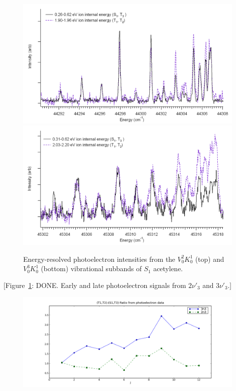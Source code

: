 \documentclass[12pt]{mitthesis}
\begin{document}
\begin{figure}[htp]
  \includegraphics[scale=0.8]{mattijs-traces-2n3.png}
  \includegraphics[scale=0.8]{mattijs-traces-3n3.png}
  \caption{Energy-resolved photoelectron intensities from the
    $V^2_0K^1_0$ (top) and $V^3_0K^1_0$ (bottom) vibrational subbands
    of $S_1$ acetylene.}
  \label{fig:mattijs-traces}
\end{figure}

[Figure~\ref{fig:mattijs-traces}: DONE. Early and late photoelectron
signals from $2\nu'_3$ and $3\nu'_3$.]

\begin{figure}[htp]
  \centering
  \includegraphics[width=7in]{mattijs-ratios.png}
  \caption{}
  \label{fig:mattijs-ratios}
\end{figure}
\end{document}
